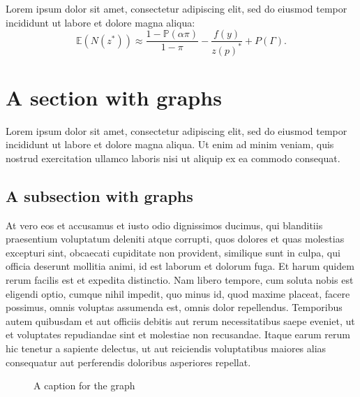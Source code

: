 \documentclass[letterpaper,12pt,leqno]{article}
\newcommand{\pdf}{figures.pdf}
\begin{document}
\begin{corollary} Lorem ipsum dolor sit amet, consectetur adipiscing elit, sed do eiusmod tempor incididunt ut labore et dolore magna aliqua:
\begin{equation*}
\mathbb{E}(N(z^*)) \approx \frac{1-\mathbb{P}(\alpha\pi)}{1-\pi}- \frac{f(y)}{z(p)^*} +P(\Gamma).
\end{equation*}\end{corollary}

\section{A section with graphs}\label{s:graphs}

Lorem ipsum dolor sit amet, consectetur adipiscing elit, sed do eiusmod tempor incididunt ut labore et dolore magna aliqua. Ut enim ad minim veniam, quis nostrud exercitation ullamco laboris nisi ut aliquip ex ea commodo consequat.

\subsection{A subsection with graphs}

At vero eos et accusamus et iusto odio dignissimos ducimus, qui blanditiis praesentium voluptatum deleniti atque corrupti, quos dolores et quas molestias excepturi sint, obcaecati cupiditate non provident, similique sunt in culpa, qui officia deserunt mollitia animi, id est laborum et dolorum fuga. Et harum quidem rerum facilis est et expedita distinctio. Nam libero tempore, cum soluta nobis est eligendi optio, cumque nihil impedit, quo minus id, quod maxime placeat, facere possimus, omnis voluptas assumenda est, omnis dolor repellendus. Temporibus autem quibusdam et aut officiis debitis aut rerum necessitatibus saepe eveniet, ut et voluptates repudiandae sint et molestiae non recusandae. Itaque earum rerum hic tenetur a sapiente delectus, ut aut reiciendis voluptatibus maiores alias consequatur aut perferendis doloribus asperiores repellat. 


\begin{figure}[t]
\hfill
{}
\caption{A caption for the graph}
\label{f:graph1}\end{figure}
\end{document}
